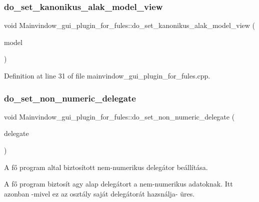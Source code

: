 \subsubsection{\texorpdfstring{do\+\_\+set\+\_\+kanonikus\+\_\+alak\+\_\+model\+\_\+view}{do\_set\_kanonikus\_alak\_model\_view}}
{\footnotesize\ttfamily void Mainvindow\+\_\+gui\+\_\+plugin\+\_\+for\+\_\+fules\+::do\+\_\+set\+\_\+kanonikus\+\_\+alak\+\_\+model\+\_\+view (\begin{DoxyParamCaption}\item[{Q\+Standard\+Item\+Model $\ast$}]{model }\end{DoxyParamCaption})\hspace{0.3cm}{\ttfamily [slot]}}



Definition at line 31 of file mainvindow\+\_\+gui\+\_\+plugin\+\_\+for\+\_\+fules.\+cpp.

\mbox{\label{classMainvindow__gui__plugin__for__fules_a260b143aa4bf25e3f8fa6d2de08aca3d}} 
\subsubsection{\texorpdfstring{do\+\_\+set\+\_\+non\+\_\+numeric\+\_\+delegate}{do\_set\_non\_numeric\_delegate}}
{\footnotesize\ttfamily void Mainvindow\+\_\+gui\+\_\+plugin\+\_\+for\+\_\+fules\+::do\+\_\+set\+\_\+non\+\_\+numeric\+\_\+delegate (\begin{DoxyParamCaption}\item[{Q\+Item\+Delegate $\ast$}]{delegate }\end{DoxyParamCaption})\hspace{0.3cm}{\ttfamily [slot]}}



A fő program altal biztosított nem-\/numerikus delegátor beállítása. 

A fő program biztosít agy alap delegátort a nem-\/numerikus adatoknak. Itt azonban -\/mivel ez az osztály saját delegátorát hazsnálja-\/ üres.


